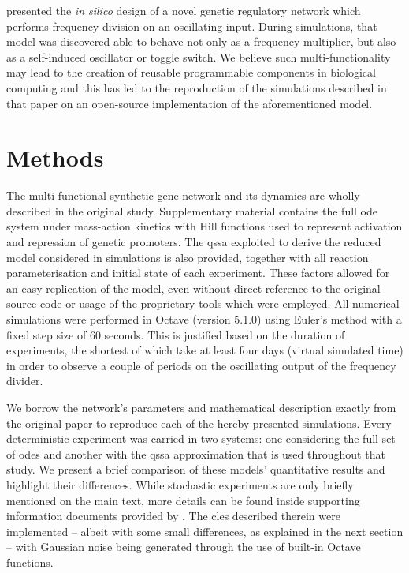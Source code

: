   \citet{originals} presented the \textit{in silico} design of a novel genetic regulatory network which performs frequency division on an oscillating input.
  During simulations, that model was discovered able to behave not only as a frequency multiplier, but also as a self-induced oscillator or toggle switch.
  We believe such multi-functionality may lead to the creation of reusable programmable components in biological computing and this has led to the reproduction of the simulations described in that paper on an open-source implementation of the aforementioned model.


\section{Methods}

  The multi-functional synthetic gene network and its dynamics are wholly described in the original study.
  Supplementary material contains the full \ac{ode} system under mass-action kinetics with Hill functions used to represent activation and repression of genetic promoters.
  The \ac{qssa} exploited to derive the reduced model considered in simulations is also provided, together with all reaction parameterisation and initial state of each experiment.
  These factors allowed for an easy replication of the model, even without direct reference to the original source code or usage of the proprietary tools which were employed.
  All numerical simulations were performed in Octave (version 5.1.0) using Euler's method with a fixed step size of 60 seconds.
  This is justified based on the duration of experiments, the shortest of which take at least four days (virtual simulated time) in order to observe a couple of periods on the oscillating output of the frequency divider.

  We borrow the network's parameters and mathematical description exactly from the original paper to reproduce each of the hereby presented simulations.
  Every deterministic experiment was carried in two systems: one considering the full set of \ac{ode}s and another with the \ac{qssa} approximation that is used throughout that study.
  We present a brief comparison of these models' quantitative results and highlight their differences.
  While stochastic experiments are only briefly mentioned on the main text, more details can be found inside supporting information documents provided by \citet{originals}.
  The \ac{cles} described therein were implemented -- albeit with some small differences, as explained in the next section -- with Gaussian noise being generated through the use of built-in Octave functions.

